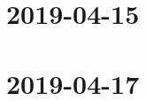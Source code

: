 \documentclass{ccg-notes}
\author{Colton Grainger}
\date{\today}
\begin{document}
\frontstuff

%      

\section{2019-04-15}
    

\section{2019-04-17}
    
\end{document}
